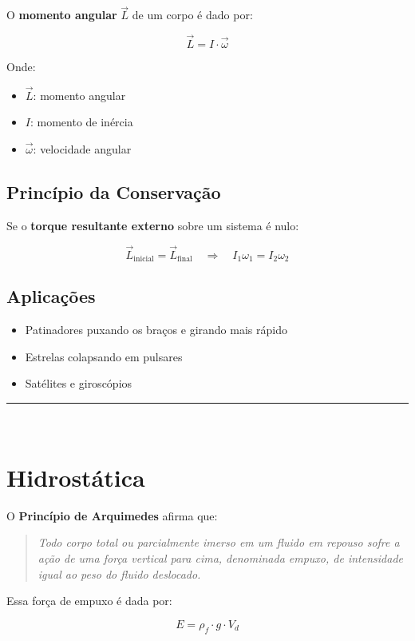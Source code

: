 \documentclass[a4paper,12pt]{article}
\begin{document}
\begin{multicols}{2}
O \textbf{momento angular} \( \vec{L} \) de um corpo é dado por:

\[
\vec{L} = I \cdot \vec{\omega}
\]

Onde:
\begin{itemize}
  \item \( \vec{L} \): momento angular
  \item \( I \): momento de inércia
  \item \( \vec{\omega} \): velocidade angular
\end{itemize}

\subsection{Princípio da Conservação}

Se o \textbf{torque resultante externo} sobre um sistema é nulo:

\[
\vec{L}_{\text{inicial}} = \vec{L}_{\text{final}}
\quad \Rightarrow \quad I_1 \omega_1 = I_2 \omega_2
\]

\subsection*{Aplicações}

\begin{itemize}
  \item Patinadores puxando os braços e girando mais rápido
  \item Estrelas colapsando em pulsares
  \item Satélites e giroscópios
\end{itemize}

\noindent\rule{\linewidth}{1pt}\\
\section{Hidrostática}

O \textbf{Princípio de Arquimedes} afirma que:

\begin{quote}
    \textit{Todo corpo total ou parcialmente imerso em um fluido em repouso sofre a ação de uma 
    força vertical para cima, denominada empuxo, de intensidade igual ao peso do fluido deslocado.}
\end{quote}

Essa força de empuxo é dada por:

\[
\boxed{
E = \rho_f \cdot g \cdot V_d
}
\]


\end{multicols}
\end{document}
